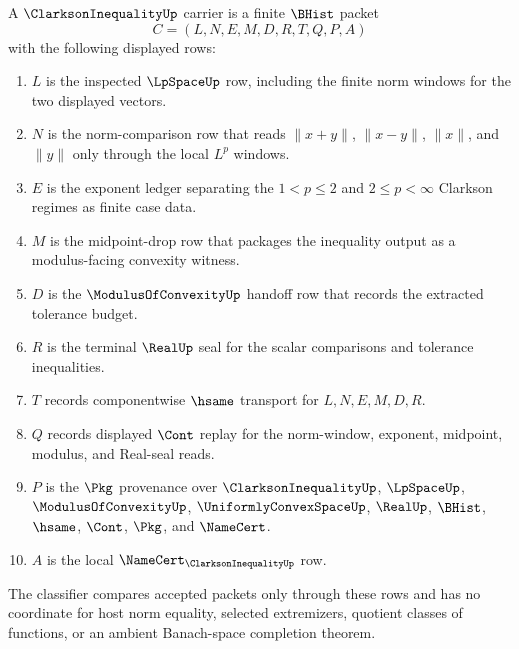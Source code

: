 \begin{definition}
\label{def:clarkson-inequality-carrier}
A $\ClarksonInequalityUp$ carrier is a finite $\BHist$ packet
$$
C=(L,N,E,M,D,R,T,Q,P,A)
$$
with the following displayed rows:
\begin{enumerate}
\item $L$ is the inspected $\LpSpaceUp$ row, including the finite norm windows for the two displayed vectors.
\item $N$ is the norm-comparison row that reads $\|x+y\|$, $\|x-y\|$, $\|x\|$, and $\|y\|$ only through the local $L^p$ windows.
\item $E$ is the exponent ledger separating the $1<p\leq 2$ and $2\leq p<\infty$ Clarkson regimes as finite case data.
\item $M$ is the midpoint-drop row that packages the inequality output as a modulus-facing convexity witness.
\item $D$ is the $\ModulusOfConvexityUp$ handoff row that records the extracted tolerance budget.
\item $R$ is the terminal $\RealUp$ seal for the scalar comparisons and tolerance inequalities.
\item $T$ records componentwise $\hsame$ transport for $L,N,E,M,D,R$.
\item $Q$ records displayed $\Cont$ replay for the norm-window, exponent, midpoint, modulus, and Real-seal reads.
\item $P$ is the $\Pkg$ provenance over $\ClarksonInequalityUp$, $\LpSpaceUp$, $\ModulusOfConvexityUp$, $\UniformlyConvexSpaceUp$, $\RealUp$, $\BHist$, $\hsame$, $\Cont$, $\Pkg$, and $\NameCert$.
\item $A$ is the local $\NameCert_{\ClarksonInequalityUp}$ row.
\end{enumerate}
The classifier compares accepted packets only through these rows and has no coordinate for host norm equality, selected extremizers, quotient classes of functions, or an ambient Banach-space completion theorem.
\end{definition}

